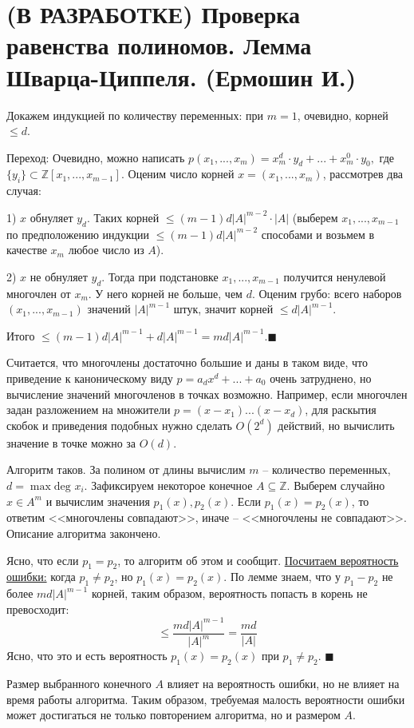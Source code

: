 \section{(В РАЗРАБОТКЕ) Проверка равенства полиномов. Лемма Шварца-Циппеля. (Ермошин И.)}

Докажем индукцией по количеству переменных: при $m=1$, очевидно, корней $\le d$.

Переход: 
Очевидно, можно написать $p(x_1,...,x_m)=x_m^d\cdot y_d+...+x_m^0\cdot y_0,$ где $\{y_i\}\subset \mathbb Z[x_1,...,x_{m-1}]$. Оценим число корней $x = (x_1, ..., x_m)$, рассмотрев два случая:

1) $x$ обнуляет $y_d$. Таких корней $\le (m-1)d|A|^{m-2} \cdot |A|$ (выберем $x_1,...,x_{m-1}$ по предположению индукции $\le(m-1)d|A|^{m-2}$ способами и возьмем в качестве $x_m$ любое число из $A$).

2) $x$ не обнуляет $y_d$. Тогда при подстановке $x_1, ..., x_{m-1}$ получится ненулевой многочлен от $x_m$. У него корней не больше, чем $d$. Оценим грубо: всего наборов $(x_1, ..., x_{m-1})$ значений $|A|^{m-1}$ штук, значит корней $\le d|A|^{m-1}$.

Итого $\le (m-1)d|A|^{m-1}+d|A|^{m-1}=md|A|^{m-1}. \blacksquare$ 


Считается, что многочлены достаточно большие и даны в таком виде, что приведение к каноническому виду $p = a_d x^d + ... + a_0$ очень затруднено, но вычисление значений многочленов в точках возможно. Например, если многочлен задан разложением на множители $p = (x-x_1)...(x-x_d)$, для раскытия скобок и приведения подобных нужно сделать $O(2^d)$ действий, но вычислить значение в точке можно за $O(d)$.

Алгоритм таков. За полином от длины вычислим $m$ -- количество переменных, $d = \max\text{deg } x_i$. Зафиксируем некоторое конечное $A \subseteq \mathbb Z$. Выберем случайно $x \in A^m$ и вычислим значения $p_1(x), p_2(x)$. Если $p_1(x) = p_2(x)$, то ответим <<многочлены совпадают>>, иначе -- <<многочлены не совпадают>>. Описание алгоритма закончено.

Ясно, что если $p_1=p_2$, то алгоритм об этом и сообщит. \underline{Посчитаем вероятность ошибки:} когда $p_1 \neq p_2$, но $p_1(x) = p_2(x)$. По лемме знаем, что у $p_1-p_2$ не более $md|A|^{m-1}$ корней, таким образом, вероятность попасть в корень не превосходит: $$\leq \frac{md|A|^{m-1}}{|A|^m} = \frac{md}{|A|}$$ Ясно, что это и есть вероятность $p_1(x)=p_2(x)$ при $p_1 \neq p_2$. $\blacksquare$

 Размер выбранного конечного $A$ влияет на вероятность ошибки, но не влияет на время работы алгоритма. Таким образом, требуемая малость вероятности ошибки может достигаться не только повторением алгоритма, но и размером $A$.